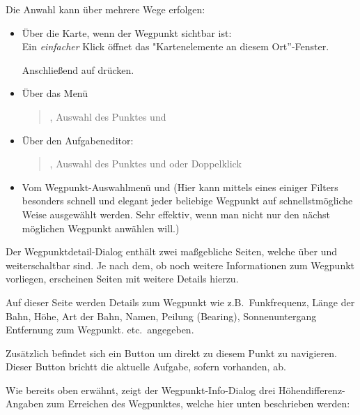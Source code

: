 Die Anwahl  kann über mehrere Wege erfolgen:
\begin{itemize}\itemsep=1em
\item
Über die Karte, wenn der Wegpunkt sichtbar ist: \\
Ein \textit{einfacher} Klick öffnet das "Kartenelemente an diesem Ort''-Fenster.

Anschließend auf  drücken.
%
%
\item
Über das Menü
\begin{quote}
\blink{}, Auswahl des Punktes und 
\end{quote}
%
%
\item Über den Aufgabeneditor: 
\begin{quote}
\blink{}\blink{}\blink{}, Auswahl des Punktes und  oder Doppelklick 
\end{quote}
%
%
\item%
Vom Wegpunkt-Auswahlmenü \blink{} und 
(Hier kann mittels eines einiger Filters besonders schnell und elegant jeder beliebige Wegpunkt auf schnellstmögliche Weise ausgewählt werden. Sehr effektiv, wenn man nicht nur den nächst möglichen Wegpunkt anwählen will.)
%
%
\end{itemize}

Der Wegpunktdetail-Dialog enthält zwei maßgebliche Seiten, welche über \button{$>$} und  \button{$<$} weiterschaltbar sind. Je nach dem, ob noch weitere Informationen zum Wegpunkt vorliegen, erscheinen Seiten mit weitere Details hierzu.

Auf dieser Seite werden Details zum Wegpunkt wie z.B.\ Funkfrequenz, Länge der Bahn, Höhe, Art der Bahn, Namen, Peilung (Bearing), Sonnenuntergang Entfernung zum Wegpunkt. etc.\ angegeben.

Zusätzlich befindet sich ein Button  um direkt zu diesem Punkt zu navigieren.  Dieser Button brichtt die aktuelle Aufgabe, sofern vorhanden, ab.

Wie bereits oben erwähnt, zeigt der Wegpunkt-Info-Dialog drei Höhendifferenz-Angaben zum Erreichen des Wegpunktes, welche hier unten beschrieben werden:

